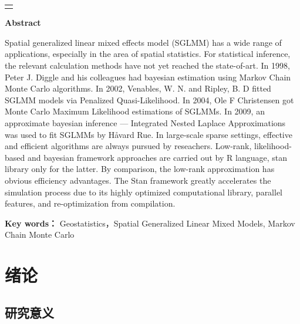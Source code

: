 \documentclass[hyperref, a4paper, UTF8, zihao = -4, linespread = 1.25, scheme = chinese]{ctexbook}
\begin{document}
\par
\vspace{1cm}
\noindent\begin{tabular}{l}
\toprule[1pt]\hline
\hspace*{14.5cm}
\end{tabular}

\begin{center}
{\bf \Large Abstract}\\
\vskip 0.6cm
\end{center}
\par
Spatial generalized linear mixed effects model (SGLMM) has a wide range of applications, especially in the area of spatial statistics. For statistical inference, the relevant calculation methods have not yet reached the state-of-art. In 1998, Peter J. Diggle and his colleagues had bayesian estimation using Markov Chain Monte Carlo algorithms. In 2002, Venables, W. N. and Ripley, B. D fitted SGLMM models via Penalized Quasi-Likelihood. In 2004, Ole F Christensen got Monte Carlo Maximum Likelihood estimations of SGLMMs. In 2009, an approximate bayesian inference --- Integrated Nested Laplace Approximations was used to fit SGLMMs by H{\aa}vard Rue. In large-scale sparse settings, effective and efficient algorithms are always pursued by reseachers. Low-rank, likelihood-based and bayesian framework approaches are carried out by R language, stan library only for the latter. By comparison, the low-rank approximation has obvious efficiency advantages. The Stan framework greatly accelerates the simulation process due to its highly optimized computational library, parallel features, and re-optimization from compilation.
\medskip
\par

{\bf Key words：} Geostatistics，Spatial Generalized Linear Mixed Models, Markov Chain Monte Carlo

\newpage 
\mbox{} 


{
\setcounter{tocdepth}{3}
\tableofcontents
}
\mainmatter

\hypertarget{intro}{%
\chapter{绪论}\label{intro}}

\section{研究意义}
\end{document}

